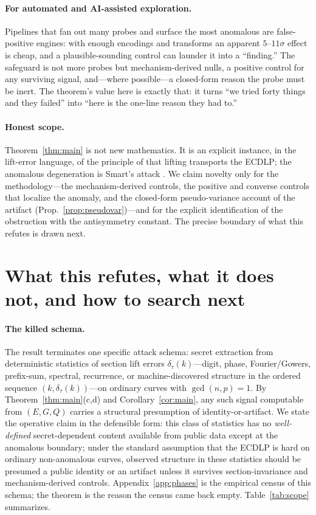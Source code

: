 \documentclass[11pt]{article}
\theoremstyle{definition}
\begin{document}
\paragraph{For automated and AI-assisted exploration.} Pipelines that fan
out many probes and surface the most anomalous are false-positive
engines: with enough encodings and transforms an apparent $5$--$11\sigma$
effect is cheap, and a plausible-sounding control can launder it into a
``finding.'' The safeguard is not more probes but mechanism-derived nulls,
a positive control for any surviving signal, and---where possible---a
closed-form reason the probe must be inert. The theorem's value here is
exactly that: it turns ``we tried forty things and they failed'' into
``here is the one-line reason they had to.''

\paragraph{Honest scope.} Theorem~\ref{thm:main} is not new mathematics.
It is an explicit instance, in the lift-error language, of the principle
of \cite{silvermanlift,silverman4faces,gadiyarpadma} that lifting
transports the ECDLP; the anomalous degeneration is Smart's attack
\cite{smart}. We claim novelty only for the methodology---the
mechanism-derived controls, the positive and converse controls that
localize the anomaly, and the closed-form pseudo-variance account of the
artifact (Prop.~\ref{prop:pseudovar})---and for the explicit
identification of the obstruction with the antisymmetry constant. The
precise boundary of what this refutes is drawn next.

\section{What this refutes, what it does not, and how to search next}
\label{sec:scope}

\paragraph{The killed schema.} The result terminates one specific attack
schema: secret extraction from deterministic statistics of section lift
errors $\delta_\tau(k)$---digit, phase, Fourier/Gowers, prefix-sum,
spectral, recurrence, or machine-discovered structure in the ordered
sequence $(k,\delta_\tau(k))$---on ordinary curves with $\gcd(n,p)=1$. By
Theorem~\ref{thm:main}(c,d) and Corollary~\ref{cor:main}, any such signal
computable from $(E,G,Q)$ carries a structural presumption of
identity-or-artifact. We state the operative claim in the defensible form:
this class of statistics has no \emph{well-defined} secret-dependent
content available from public data except at the anomalous boundary; under
the standard assumption that the ECDLP is hard on ordinary non-anomalous
curves, observed structure in these statistics should be presumed a public
identity or an artifact unless it survives section-invariance and
mechanism-derived controls. Appendix~\ref{app:phases} is the empirical
census of this schema; the theorem is the reason the census came back
empty. Table~\ref{tab:scope} summarizes.
\end{document}
